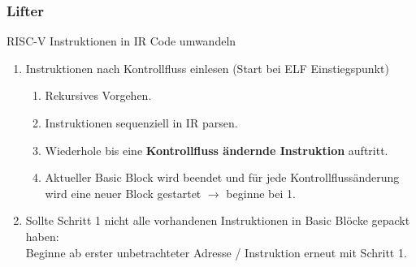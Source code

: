 

\begin{frame}
    \frametitle{Lifter}{RISC-V Instruktionen in IR Code umwandeln}

    \begin{enumerate}
        \setlength\itemsep{0.5em}
        \item Instruktionen nach Kontrollfluss einlesen (Start bei ELF Einstiegspunkt)
              \begin{enumerate}
                  \setlength\itemsep{0.5em}
                  \item Rekursives Vorgehen.
                  \item Instruktionen sequenziell in IR parsen.
                  \item Wiederhole bis eine \textbf{Kontrollfluss ändernde Instruktion} auftritt.
                  \item Aktueller Basic Block wird beendet und für jede Kontrollflussänderung wird eine neuer Block gestartet $\rightarrow$ beginne bei 1.
              \end{enumerate}
        \item Sollte Schritt 1 nicht alle vorhandenen Instruktionen in Basic Blöcke gepackt haben:\\ Beginne ab erster unbetrachteter Adresse / Instruktion erneut mit Schritt 1.
    \end{enumerate}
\end{frame}
\clearpage


